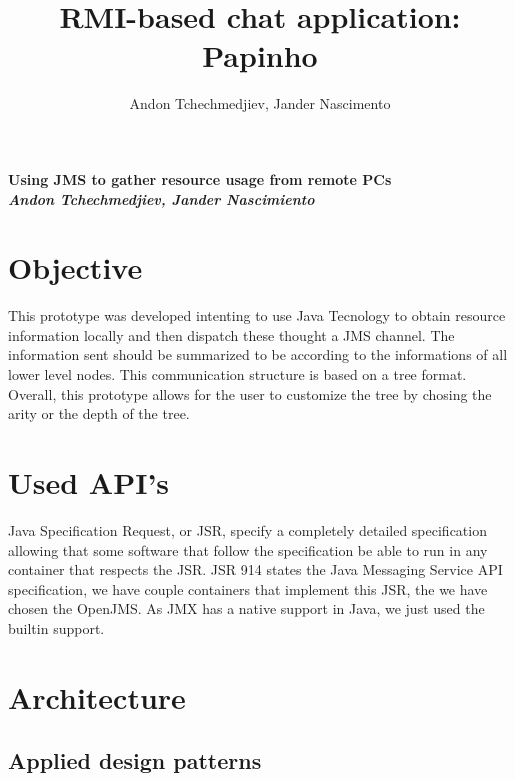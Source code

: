 \documentclass[times, 8pt,twocolumn]{article}
\title {RMI-based chat application: Papinho}
\author{Andon Tchechmedjiev, Jander Nascimento}
\begin{document}
{\Large {\bf Using JMS to gather resource usage from remote PCs}} \\
{\large {\bf {\it Andon Tchechmedjiev, Jander Nascimiento}}}
\section{Objective}
This prototype was developed intenting to use Java Tecnology to obtain resource information locally and then dispatch these thought a JMS channel.
The information sent should be summarized to be according to the informations of all lower level nodes.
This communication structure is based on a tree format.
Overall, this prototype allows for the user to customize the tree by chosing the arity or the depth of the tree.

\section{Used API's}

Java Specification Request, or JSR, specify a completely detailed specification allowing that some software that follow the specification be able to run in any container that respects the JSR.
JSR 914 states the Java Messaging Service API specification, we have couple containers that implement this JSR, the we have chosen the OpenJMS.
As JMX has a native support in Java, we just used the builtin support. 

\section{Architecture}
\subsection{Applied design patterns}
\end{document}
